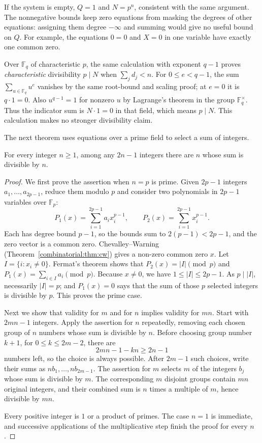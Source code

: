 If the system is empty, $Q=1$ and $N=p^n$, consistent with the same argument.
The nonnegative bounds keep zero equations from masking the degrees of other
equations: assigning them degree $-\infty$ and summing would give no useful
bound on $Q$. For example,
the equations $0=0$ and $X=0$ in one variable have exactly one common zero.

Over $\mathbb F_q$ of characteristic $p$, the same calculation with exponent
$q-1$ proves \emph{characteristic} divisibility $p\mid N$ when $\sum_jd_j<n$.
For $0\le e<q-1$, the sum $\sum_{u\in\mathbb F_q}u^e$ vanishes by the
same root-bound and scaling proof; at $e=0$ it is $q\cdot1=0$.
Also $u^{q-1}=1$ for nonzero $u$ by Lagrange's theorem in the group
$\mathbb F_q^\times$. Thus the indicator sum is $N\cdot1=0$ in that field,
which means $p\mid N$. This calculation makes no stronger divisibility claim.

The next theorem uses equations over a prime field to select a sum of integers.

\begin{theorem}\label{combinatorial:thm:egz}
For every integer $n\ge1$, among any $2n-1$ integers there are $n$ whose sum is divisible by $n$.
\end{theorem}
\begin{proof}
We first prove the assertion when $n=p$
is prime. Given $2p-1$ integers
$a_1,\ldots,a_{2p-1}$, reduce them modulo
$p$ and consider two polynomials in
$2p-1$ variables over $\mathbb F_p$:
\[
P_1(x)=\sum_{i=1}^{2p-1}a_ix_i^{p-1},
\qquad
P_2(x)=\sum_{i=1}^{2p-1}x_i^{p-1}.
\]
Each has degree bound $p-1$, so the bounds sum to $2(p-1)<2p-1$,
and the zero vector is a common zero.
Chevalley--Warning
(Theorem~\ref{combinatorial:thm:cw})
gives a non-zero common zero $x$.
Let $I=\{i:x_i\ne0\}$. Fermat's theorem
shows that $P_2(x)=|I|\pmod p$ and
$P_1(x)=\sum_{i\in I}a_i\pmod p$.
Because $x\ne0$, we have
$1\le|I|\le2p-1$. As $p\mid|I|$,
necessarily $|I|=p$; and $P_1(x)=0$ says that the sum of those
$p$ selected integers is divisible
by $p$. This proves the prime case.

Next we show that validity for $m$ and
for $n$ implies validity for $mn$.
Start with $2mn-1$ integers. Apply
the assertion for $n$ repeatedly,
removing each chosen group of $n$
numbers whose sum is divisible by $n$.
Before choosing group number $k+1$,
for $0\le k\le2m-2$, there are
\[
2mn-1-kn\ge2n-1
\]
numbers left, so the choice is always
possible. After $2m-1$ such choices,
write their sums as $nb_1,\ldots,nb_{2m-1}$.
The assertion for $m$ selects $m$
of the integers $b_j$ whose sum is
divisible by $m$. The corresponding
$m$ disjoint groups contain $mn$
original integers, and their combined
sum is $n$ times a multiple of $m$,
hence divisible by $mn$.

Every positive integer is $1$ or a
product of primes. The case $n=1$
is immediate, and successive applications
of the multiplicative step finish
the proof for every $n$.
\end{proof}

